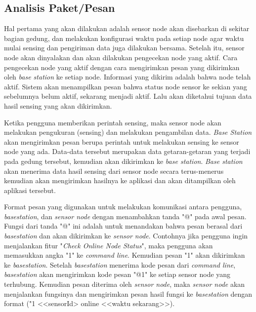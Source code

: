 \subsection{Analisis Paket/Pesan}
Hal pertama yang akan dilakukan adalah sensor node akan disebarkan di sekitar bagian gedung, dan melakukan konfigurasi waktu pada setiap node agar waktu mulai sensing dan pengiriman data juga dilakukan bersama. Setelah itu, sensor node akan dinyalakan dan akan dilakukan pengecekan node yang aktif. Cara pengecekan node yang aktif dengan cara mengirimkan pesan yang dikirimkan oleh \textit{base station} ke setiap node. Informasi yang dikirim adalah bahwa node telah aktif. Sistem akan menampilkan pesan bahwa status node sensor ke sekian yang sebelumnya belum aktif, sekarang menjadi aktif. Lalu akan diketahui tujuan data hasil sensing yang akan dikirimkan. 

Ketika pengguna memberikan perintah sensing, maka sensor node akan melakukan pengukuran (sensing) dan melakukan pengambilan data. \textit{Base Station} akan mengirimkan pesan berupa perintah untuk melakukan sensing ke sensor node yang ada. Data-data tersebut merupakan data getaran-getaran yang terjadi pada gedung tersebut, kemudian akan dikirimkan ke \textit{base station}. \textit{Base station} akan menerima data hasil sensing dari sensor node secara terus-menerus kemudian akan mengirimkan hasilnya ke aplikasi dan akan ditampilkan oleh aplikasi tersebut.

Format pesan yang digunakan untuk melakukan komunikasi antara pengguna, \textit{basestation}, dan \textit{sensor node} dengan menambahkan tanda "@" pada awal pesan. Fungsi dari tanda "@" ini adalah untuk menandakan bahwa pesan berasal dari \textit{basestation} dan akan dikirimkan ke \textit{sensor node}. Contohnya jika pengguna ingin menjalankan fitur "\textit{Check Online Node Status}", maka pengguna akan memasukkan angka "1" ke \textit{command line}. Kemudian pesan "1" akan dikirimkan ke \textit{basestation}. Setelah \textit{basestation} menerima kode pesan dari \textit{command line}, \textit{basestation} akan mengirimkan kode pesan "@1" ke setiap sensor node yang terhubung. Kemudian pesan diterima oleh \textit{sensor node}, maka \textit{sensor node} akan menjalankan fungsinya dan mengirimkan pesan hasil fungsi ke \textit{basestation} dengan format ("1 <<sensorId> online <<waktu sekarang>>). 